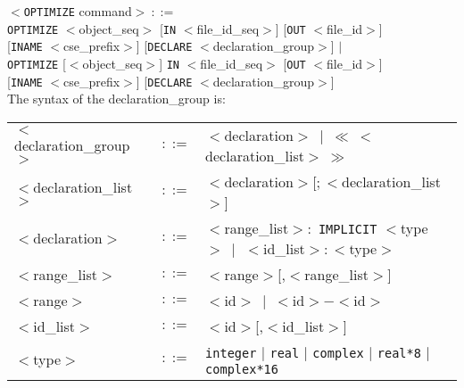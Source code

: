 $<${\tt OPTIMIZE} command$>~::=$\\
 \hspace*{1cm} {\tt OPTIMIZE} $<$object\_seq$>$ [{\tt IN} $<$file\_id\_seq$>$] 
 [{\tt OUT} $<$file\_id$>$]\\ 
 \hspace*{3cm} [{\tt INAME} $<$cse\_prefix$>$] 
  [{\tt DECLARE} $<$declaration\_group$>$] $\mid$\\
 \hspace*{1cm} {\tt OPTIMIZE} [$<$object\_seq$>$] {\tt IN} $<$file\_id\_seq$>$ 
 [{\tt OUT} $<$file\_id$>$]\\
 \hspace*{3cm} [{\tt INAME} $<$cse\_prefix$>$] 
 [{\tt DECLARE} $<$declaration\_group$>$]\\

The syntax of the declaration\_group is:
\begin{center}
\begin{tabular}{lcl}
$<$declaration\_group$>$ & $::=$ & $<$declaration$>~\mid~\ll~<$declaration\_list$>~\gg$\\
$<$declaration\_list$>$ & $::=$ & $<$declaration$>$[$;<$declaration\_list$>$]\\
$<$declaration$>$ & $::=$ & $<$range\_list$>:$ {\tt IMPLICIT} $<$type$>~\mid$
 $<$id\_list$>:<$type$>$\\
$<$range\_list$>$& $::=$ & $<$range$>$[,$<$range\_list$>$]\\
$<$range$>$ & $::=$ & $<$id$>~\mid~<$id$>-<$id$>$\\
$<$id\_list$>$ & $::=$ & $<$id$>$[,$<$id\_list$>$]\\
$<$type$>$ & $::=$ & {\tt integer} $\mid$ {\tt real} $\mid$ {\tt complex} $\mid$ {\tt real*8} $\mid$ {\tt complex*16}
\end{tabular}
\end{center}

